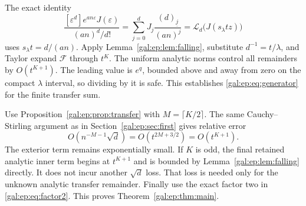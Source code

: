 \documentclass[11pt,letterpaper]{article}
\numberwithin{equation}{section}
\theoremstyle{definition}\newtheorem{definition}[theorem]{Definition}
\theoremstyle{remark}\newtheorem{remark}[theorem]{Remark}
\newcommand{\eps}{\varepsilon}
\newcommand{\coef}[1]{\left[#1\right]}
\newcommand{\fall}[2]{(#1)_{\underline{#2}}}
\begin{document}
The exact identity
\begin{equation}\label{gal:ep:eq:exactL}
\frac{\coef{\eps^d}e^{an\eps}J(\eps)}{(an)^d/d!}
=\sum_{j=0}^dJ_j\frac{\fall d j}{(an)^j}
=\mathcal L_d\bigl(J(s_\lambda tz)\bigr)
\end{equation}
uses $s_\lambda t=d/(an)$. Apply Lemma~\ref{gal:ep:lem:falling}, substitute $d^{-1}=t/\lambda$, and Taylor expand $\mathcal F$ through $t^K$. The uniform analytic norms control all remainders by $O(t^{K+1})$. The leading value is $e^q$, bounded above and away from zero on the compact $\lambda$ interval, so dividing by it is safe. This establishes \eqref{gal:ep:eq:generator} for the finite transfer sum.

Use Proposition~\ref{gal:ep:prop:transfer} with $M=\lceil K/2\rceil$. The same Cauchy--Stirling argument as in Section~\ref{gal:ep:sec:first} gives relative error
\begin{equation}\label{gal:ep:eq:loss}
O(n^{-M-1}\sqrt d)=O(t^{2M+3/2})=O(t^{K+1}).
\end{equation}
The exterior term remains exponentially small. If $K$ is odd, the final retained analytic inner term begins at $t^{K+1}$ and is bounded by Lemma~\ref{gal:ep:lem:falling} directly. It does not incur another $\sqrt d$ loss. That loss is needed only for the unknown analytic transfer remainder. Finally use the exact factor two in \eqref{gal:ep:eq:factor2}. This proves Theorem~\ref{gal:ep:thm:main}.
\end{document}
